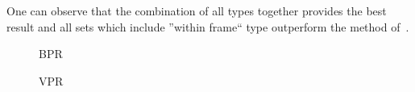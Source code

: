 One can observe that the combination of all types together provides the best result and all sets which include ''within frame`` type outperform the method of~\cite{GalassoCS12}.
\begin{figure}[htbp]
\begin{minipage}[t]{1\textwidth}
\centering
\footnotesize BPR

\hfill \hfill    
{} 
\hfill  
{} 
\hfill 
{} 
\hfill   \hfill
\end{minipage}
\begin{minipage}[t]{1\textwidth}
\centering
\footnotesize VPR


\end{minipage}
\end{figure}
